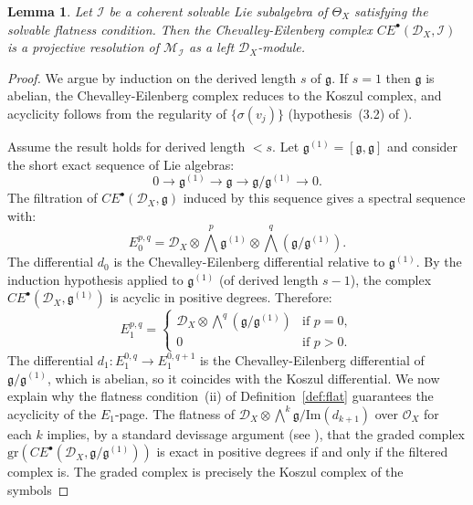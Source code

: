 \documentclass[12pt,a4paper]{article}
\newtheorem{lemma}[theorem]{Lemma}
\begin{document}
\begin{lemma}\label{lem:acyclic}
Let $\mathcal{I}$ be a coherent solvable Lie subalgebra of $\Theta_X$
satisfying the solvable flatness condition. Then the Chevalley-Eilenberg
complex $CE^\bullet(\mathcal{D}_X, \mathcal{I})$ is a projective resolution
of $\mathcal{M}_{\mathcal{I}}$ as a left $\mathcal{D}_X$-module.
\end{lemma}

\begin{proof}
We argue by induction on the derived length $s$ of $\mathfrak{g}$.
If $s=1$ then $\mathfrak{g}$ is abelian, the Chevalley-Eilenberg complex
reduces to the Koszul complex, and acyclicity follows from the regularity
of $\{\sigma(v_j)\}$ (hypothesis~(3.2) of \cite{D16}).

Assume the result holds for derived length $< s$. Let
$\mathfrak{g}^{(1)} = [\mathfrak{g},\mathfrak{g}]$ and consider the
short exact sequence of Lie algebras:
\[
0 \to \mathfrak{g}^{(1)} \to \mathfrak{g}
\to \mathfrak{g}/\mathfrak{g}^{(1)} \to 0.
\]
The filtration of $CE^\bullet(\mathcal{D}_X, \mathfrak{g})$ induced by
this sequence gives a spectral sequence with:
\[
E_0^{p,q} = \mathcal{D}_X \otimes \bigwedge^p\mathfrak{g}^{(1)}
\otimes \bigwedge^q(\mathfrak{g}/\mathfrak{g}^{(1)}).
\]
The differential $d_0$ is the Chevalley-Eilenberg differential relative
to $\mathfrak{g}^{(1)}$. By the induction hypothesis applied to
$\mathfrak{g}^{(1)}$ (of derived length $s-1$), the complex
$CE^\bullet(\mathcal{D}_X, \mathfrak{g}^{(1)})$ is acyclic in positive
degrees. Therefore:
\[
E_1^{p,q} =
\begin{cases}
\mathcal{D}_X \otimes \bigwedge^q(\mathfrak{g}/\mathfrak{g}^{(1)})
& \text{if } p = 0, \\
0 & \text{if } p > 0.
\end{cases}
\]
The differential $d_1 : E_1^{0,q} \to E_1^{0,q+1}$ is the
Chevalley-Eilenberg differential of $\mathfrak{g}/\mathfrak{g}^{(1)}$,
which is abelian, so it coincides with the Koszul differential.
We now explain why the flatness condition~(ii) of
Definition~\ref{def:flat} guarantees the acyclicity of the $E_1$-page.
The flatness of
$\mathcal{D}_X \otimes \bigwedge^k\mathfrak{g} / \mathrm{Im}(d_{k+1})$
over $\mathcal{O}_X$ for each $k$ implies, by a standard devissage
argument (see \cite[Prop.~A.17]{K03}), that the graded complex
$\mathrm{gr}(CE^\bullet(\mathcal{D}_X, \mathfrak{g}/\mathfrak{g}^{(1)}))$
is exact in positive degrees if and only if the filtered complex is.
The graded complex is precisely the Koszul complex of the symbols

\end{proof}
\end{document}
